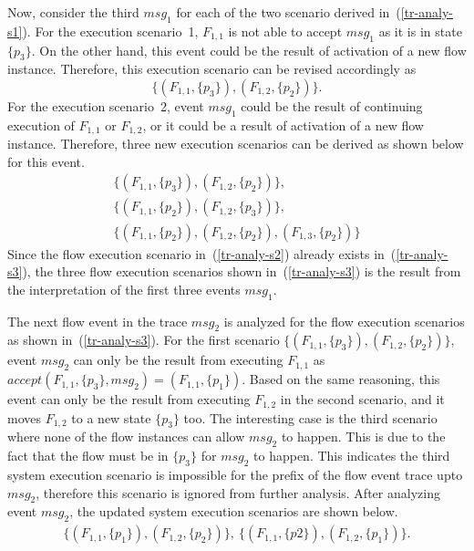 \documentclass[conference]{IEEEtran}
\begin{document}
Now, consider the third $\mathit{msg}_1$ for each of the two scenario derived in~(\ref{tr-analy-s1}).    For the execution scenario~1, $F_{1,1}$ is not able to accept $\mathit{msg}_1$ as it is in state $\{p_3\}$.  On the other hand, this event could be the result of activation of a new flow instance.  Therefore, this execution scenario can be revised accordingly as 
\[
\label{tr-analy-s2}\tag{2}
\{(F_{1,1}, \{p_3\}),(F_{1,2},\{p_2\})\}.
\]   
For the execution scenario~2, event $\mathit{msg}_1$ could be the result of continuing execution of $F_{1,1}$ or $F_{1,2}$, or it could be a result of activation of a new flow instance.  Therefore,  three new execution scenarios can be derived as shown below for this event.
\[
\label{tr-analy-s3}\tag{3}
\begin{array}{l}
\{(F_{1,1}, \{p_3\}), (F_{1,2}, \{p_2\})\},\\
\{(F_{1,1}, \{p_2\}), (F_{1,2}, \{p_3\})\}, \\
\{(F_{1,1}, \{p_2\}), (F_{1,2}, \{p_2\}), (F_{1,3}, \{p_2\})\}
\end{array}
\]
Since the flow execution scenario in~(\ref{tr-analy-s2}) already exists in~(\ref{tr-analy-s3}), the three flow execution scenarios shown in~(\ref{tr-analy-s3}) is the result from the interpretation of the first three events $\mathit{msg}_1$.

The next flow event in the trace $\mathit{msg_2}$ is analyzed for the flow execution scenarios as shown in~(\ref{tr-analy-s3}).   For the first scenario $\{(F_{1,1}, \{p_3\}), (F_{1,2}, \{p_2\})\}$, event $\mathit{msg_2}$ can only be the result from executing $F_{1,1}$ as $\mathit{accept}(F_{1,1}, \{p_3\}, \mathit{msg_2}) = (F_{1,1}, \{p_1\})$.   Based on the same reasoning, this event can only be the result from executing $F_{1,2}$ in the second scenario, and it moves $F_{1,2}$ to a new state $\{p_3\}$ too.  The interesting case is the third scenario where none of the flow instances can allow $\mathit{msg_2}$ to happen.  This is due to the fact that the flow must be in $\{p_3\}$ for $\mathit{msg_2}$ to happen.  This indicates the third system execution scenario is impossible for the prefix of the flow event trace upto $\mathit{msg_2}$, therefore this scenario is ignored from further analysis.  After analyzing event $\mathit{msg_2}$, the updated system execution scenarios are shown below.
\[
\begin{array}{l}
\{(F_{1,1}, \{p_1\}), (F_{1,2}, \{p_2\})\},\ \{(F_{1,1}, \{p2\}), (F_{1,2}, \{p_1\})\}.
\end{array}
\]
\end{document}
